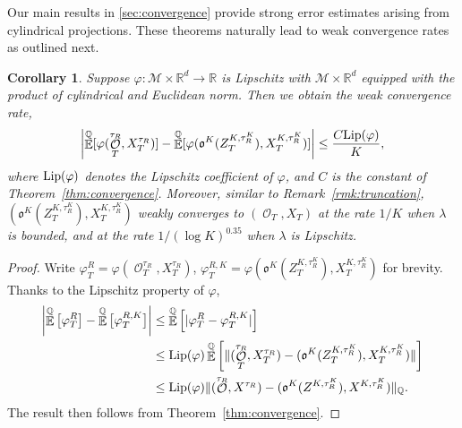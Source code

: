 \documentclass[11pt]{article}
\numberwithin{equation}{section}
\theoremstyle{plain}
\newtheorem{corollary}{Corollary}[section]
\theoremstyle{definition}
\DeclareMathOperator{\E}{\mathbb{E}}
\DeclareMathOperator{\Q}{\mathbb{Q}}
\DeclareMathOperator{\calO}{\mathcal{O}}
\def\mo{\mathfrak{o}}
\begin{document}
Our main results in \cref{sec:convergence} provide strong error estimates arising from cylindrical projections. These theorems naturally lead to weak convergence rates as outlined next. %

\begin{corollary}\label{cor:weakconvergence}
    Suppose $\varphi:\mathcal{M} \times \mathbb R^d \to \mathbb R$ is Lipschitz with $\mathcal{M}\times \mathbb R^d$ equipped with the product of cylindrical  and Euclidean norm. Then we obtain the weak convergence rate, 
    \begin{align*}
        \left| \E^{\Q}[ \varphi(\calO_T^{\tau_R},X_T^{\tau_R})]-  \E^{\Q}[ \varphi(  \mo^K(Z_T^{K,\tau^K_R}) ,X_T^{K,\tau^K_R})] \right| \leq \frac{C\textnormal{Lip}(\varphi)}{K},
    \end{align*}
    where $\textnormal{Lip}(\varphi)$ denotes the Lipschitz coefficient of $\varphi$, and $C$ is the constant of Theorem~\ref{thm:convergence}. Moreover, similar to Remark~\ref{rmk:truncation}, $(\mo^K(Z_T^{K,\tau^K_R}) ,X_T^{K,\tau^K_R})$  weakly converges to $(\calO_T,X_T)$ at the rate  $1/K$ when $\lambda$ is bounded, and at the rate  $1/(\log K)^{0.35}$ when $\lambda$ is Lipschitz. 
\end{corollary}
\begin{proof}
Write $\varphi_T^R = \varphi(\calO_T^{\tau_R},X_T^{\tau_R})$, $\varphi_T^{R,K} = \varphi(  \mo^K(Z_T^{K,\tau^K_R}) ,X_T^{K,\tau^K_R})$ for brevity. 
Thanks to  the Lipschitz property of $\varphi$, 
\begin{align*}
    \left| \E^{\Q}\big[\varphi_T^R\big]-  \E^{\Q}\big[ \varphi_T^{R,K}\big] \right| &\le  \E^{\Q} \left[ |\varphi_T^R- \varphi_T^{R,K}| \right] \\
    &\le \textnormal{Lip}(\varphi) \E^{\Q} \left[ 
    \lVert (\calO^{\tau_R}_T,X^{\tau_R}_T)-( \mo^K(Z^{K,\tau^K_R}_T) ,X^{K,\tau^K_R}_T) \rVert \right]\\ 
    &\le  \textnormal{Lip}(\varphi)\lVert (\calO^{\tau_R},X^{\tau_R})-( \mo^K(Z^{K,\tau^K_R}) ,X^{K,\tau^K_R}) \rVert_{\Q}.
\end{align*}
The result then follows from Theorem~\ref{thm:convergence}. 
\end{proof}
\end{document}
